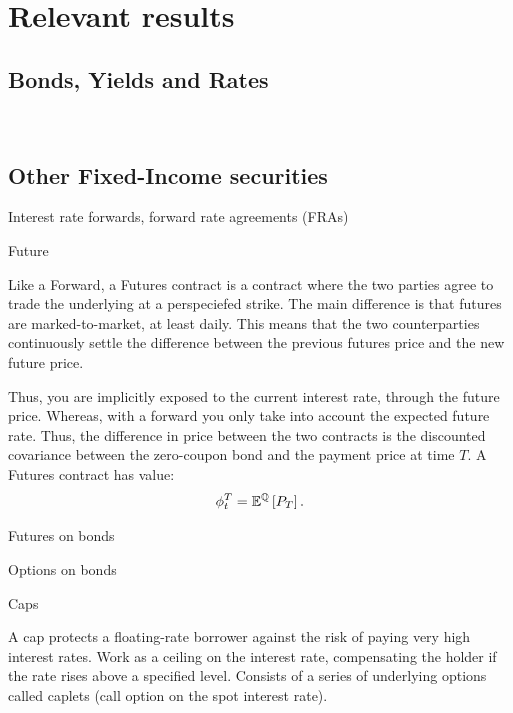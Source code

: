 \section{Relevant results}


\subsection{Bonds, Yields and Rates}

$\quad $

\subsection{Other Fixed-Income securities}


\begin{description}
\item[Interest rate forwards, forward rate agreements (FRAs)] 
\end{description}


\begin{description}
\item[Future] 
\end{description}
Like a Forward, a Futures contract is a contract where the two parties agree to trade the underlying
at a perspeciefed strike. The main difference is that futures are marked-to-market, at least daily.
This means that the two counterparties continuously settle the difference between the previous
futures price and the new future price. 

Thus, you are implicitly exposed to the current interest rate, through the future price. 
Whereas, with a forward you only take into account the expected future rate. 
Thus, the difference in price between the two contracts is the discounted covariance between the
zero-coupon bond and the payment price at time $T$. A Futures contract has value: 
\[
  \phi_{t}^{T}=\mathbb{E}^{\mathbb{Q}}\left[P_{T}\right]
.\]

\begin{description}
\item[Futures on bonds] 
\end{description}

\begin{description}
\item[Options on bonds] 
\end{description}


\begin{description}
\item[Caps] 
\end{description}
A cap protects a floating-rate borrower against the risk of paying very high interest rates.
Work as a ceiling on the interest rate, compensating the holder if the rate rises above a specified
level. Consists of a series of underlying options called caplets (call option on the spot interest
rate).

